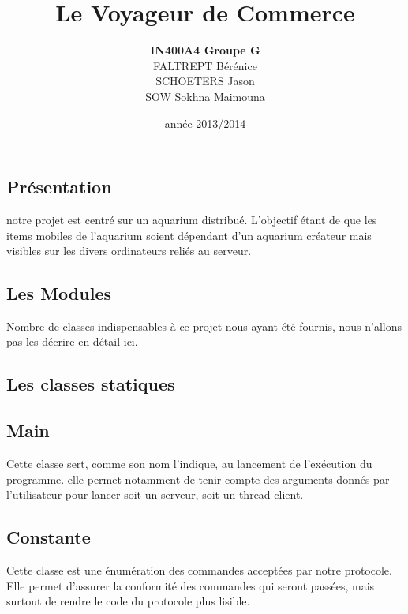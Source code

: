 \documentclass[a4paper, 12pt]{report}
\title{Le Voyageur de Commerce}
\author{\textbf{IN400A4 Groupe G}\\ FALTREPT Bérénice \\ SCHOETERS Jason \\ SOW Sokhna Maimouna}
\date{année 2013/2014}
\begin{document}
	\begin{spacing}{1.3}
\maketitle%
\tableofcontents
\newpage
\textcolor{colortitre1}{\section*{Présentation}} 

notre projet est centré sur un aquarium distribué. L'objectif étant de que les items mobiles de l'aquarium soient dépendant d'un aquarium créateur mais visibles sur les divers ordinateurs reliés au serveur.

\textcolor{colortitre1}{\subsection*{Les Modules}}  

Nombre de classes indispensables à ce projet nous ayant été fournis, nous n'allons pas les décrire en détail ici.

	\textcolor{colortitre2}{\subsection*{Les classes statiques}}  
	
		\textcolor{colortitre3}{\subsection*{Main}}  
		
Cette classe sert, comme son nom l'indique, au lancement de l'exécution du programme. elle permet notamment de tenir compte des arguments donnés par l'utilisateur pour lancer soit un serveur, soit un thread client.
		
		
		\textcolor{colortitre3}{\subsection*{Constante}}  
Cette classe est une énumération des commandes acceptées par notre protocole. Elle permet d'assurer la conformité des commandes qui seront passées, mais surtout de rendre le code du protocole plus lisible.


\end{spacing}
\end{document}
